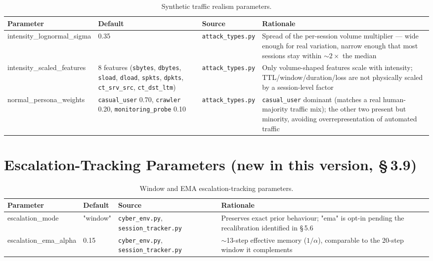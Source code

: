 \begin{table}[ht]
  \centering
  \caption{Synthetic traffic realism parameters.}
  \label{tab:traffic_realism}
  \begin{tabular}{p{2.8cm}p{3.6cm}p{2.3cm}p{6.0cm}}
    \toprule
    Parameter & Default & Source & Rationale \\
    \midrule
    intensity\_lognormal\_sigma & 0.35 & \texttt{attack\_types.py} & Spread of the per-session volume multiplier --- wide enough for real variation, narrow enough that most sessions stay within $\sim 2\times$ the median \\
    intensity\_scaled\_features & 8 features (\texttt{sbytes}, \texttt{dbytes}, \texttt{sload}, \texttt{dload}, \texttt{spkts}, \texttt{dpkts}, \texttt{ct\_srv\_src}, \texttt{ct\_dst\_ltm}) & \texttt{attack\_types.py} & Only volume-shaped features scale with intensity; TTL/window/duration/loss are not physically scaled by a session-level factor \\
    normal\_persona\_weights & \texttt{casual\_user} 0.70, \texttt{crawler} 0.20, \texttt{monitoring\_probe} 0.10 & \texttt{attack\_types.py} & \texttt{casual\_user} dominant (matches a real human-majority traffic mix); the other two present but minority, avoiding overrepresentation of automated traffic \\
    \bottomrule
  \end{tabular}
\end{table}

\section{Escalation-Tracking Parameters (new in this version, \S\,3.9)}

\begin{table}[ht]
  \centering
  \caption{Window and EMA escalation-tracking parameters.}
  \label{tab:escalation_tracking}
  \begin{tabular}{p{2.8cm}p{3.6cm}p{2.3cm}p{6.0cm}}
    \toprule
    Parameter & Default & Source & Rationale \\
    \midrule
    escalation\_mode & "window" & \texttt{cyber\_env.py}, \texttt{session\_tracker.py} & Preserves exact prior behaviour; "ema" is opt-in pending the recalibration identified in \S\,5.6 \\
    escalation\_ema\_alpha & 0.15 & \texttt{cyber\_env.py}, \texttt{session\_tracker.py} & $\sim$13-step effective memory ($1/\alpha$), comparable to the 20-step window it complements \\
    \bottomrule
  \end{tabular}
\end{table}

